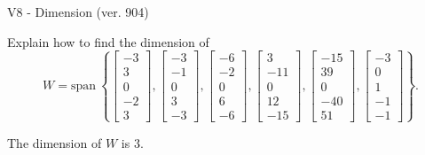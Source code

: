 \begin{exercise}
  \begin{exerciseTitle}V8 - Dimension (ver. 904)\end{exerciseTitle}
  \begin{exerciseStatement}
    Explain how to find the dimension of 
\[W=\mathrm{span}\ \left\{\left[\begin{array}{r}
-3 \\
3 \\
0 \\
-2 \\
3
\end{array}\right] , \left[\begin{array}{r}
-3 \\
-1 \\
0 \\
3 \\
-3
\end{array}\right] , \left[\begin{array}{r}
-6 \\
-2 \\
0 \\
6 \\
-6
\end{array}\right] , \left[\begin{array}{r}
3 \\
-11 \\
0 \\
12 \\
-15
\end{array}\right] , \left[\begin{array}{r}
-15 \\
39 \\
0 \\
-40 \\
51
\end{array}\right] , \left[\begin{array}{r}
-3 \\
0 \\
1 \\
-1 \\
-1
\end{array}\right]\right\}.\]



  \end{exerciseStatement}
  \begin{exerciseAnswer}
   The dimension of \(W\) is  \(3\).
  


  \end{exerciseAnswer}
\end{exercise}